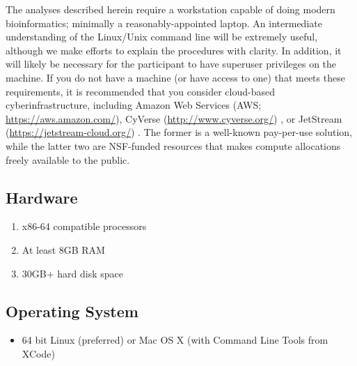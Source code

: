 \documentclass[runningheads,a4paper]{llncs}
\begin{document}
\begin{linenumbers}
The analyses described herein require a workstation capable of doing modern bioinformatics; minimally a reasonably-appointed laptop.
An intermediate understanding of the Linux/Unix command line will be extremely useful, although we make efforts to explain the procedures with clarity. In addition, it will likely be necessary for the participant to have superuser privileges on the machine.
If you do not have a machine (or have access to one) that meets these requirements, it is recommended that you consider cloud-based cyberinfrastructure, including Amazon Web Services (AWS; \url{https://aws.amazon.com/}), CyVerse (\url{http://www.cyverse.org/}) \cite{Merchant:2016jn}, or JetStream (\url{https://jetstream-cloud.org/}) \cite{Stewart:2015abc}.
The former is a well-known pay-per-use solution, while the latter two are NSF-funded resources that makes compute allocations freely available to the public.

\subsection{Hardware}
\begin{enumerate} 
\item x86-64 compatible processors
\item At least 8GB RAM
\item 30GB+ hard disk space
\end{enumerate}

\subsection{Operating System}
\begin{itemize}
\item 64 bit Linux (preferred) or Mac OS X (with Command Line Tools from XCode)
\end{itemize}


\end{linenumbers}
\end{document}
